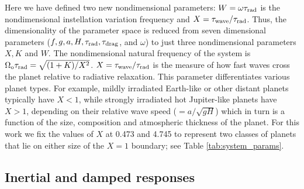 \documentclass[trackchanges,twocolumn]{aastex7}
\begin{document}
Here we have defined two new nondimensional parameters: $W=\omega \tau_{\rm rad}$ is the nondimensional instellation variation frequency and $X=\tau_{\rm wave}/\tau_{\rm rad}$. Thus, the dimensionality of the parameter space is reduced from seven dimensional parameters ($f, g, a, H, \tau_{\rm rad}, \tau_{\rm drag}$, and $\omega$) to just three nondimensional parameters $X, K$ and $W$. The nondimensional natural frequency of the system is $\Omega_{\rm o} \tau_{\rm rad} = \sqrt{(1 + K)/X^2}$. $X=\tau_{\rm wave}/\tau_{\rm rad}$ is the measure of how fast waves cross the planet relative to radiative relaxation. This parameter differentiates various planet types. For example, mildly irradiated Earth-like or other distant planets typically have $X<1$, while strongly irradiated hot Jupiter-like planets have $X>1$, depending on their relative wave speed ($=a/\sqrt{gH}$) which in turn is a function of the size, composition and atmospheric thickness of the planet. For this work we fix the values of $X$ at 0.473 and 4.745 to represent two classes of planets that lie on either size of the $X=1$ boundary; see Table \ref{tab:system_params}.


\subsection{Inertial and damped responses}\label{sec:in_dam_resp}
\end{document}
